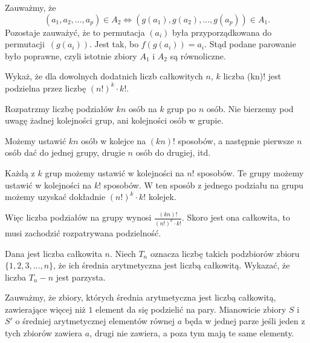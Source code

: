 Zauważmy, że
\[
	(a_1, a_2, ..., a_p) \in A_2 \iff (g(a_1), g(a_2), ..., g(a_p)) \in A_1.
\] 
Pozostaje zauważyć, że to permutacja $(a_i)$ była przyporządkowana do permutacji~$(g(a_i))$. Jest tak, bo $f(g(a_i)) = a_i$. Stąd podane parowanie było poprawne, czyli istotnie zbiory $A_1$ i $A_2$ są równoliczne.


\vspace{5px}

\begin{problem}{5}
	Wykaż, że dla dowolnych dodatnich liczb całkowitych $n$, $k$ liczba	(kn)!
	jest podzielna przez liczbę $(n!)^k \cdot k!$.
\end{problem}

\vspace{5px}

\noindent
Rozpatrzmy liczbę podziałów $kn$ osób na $k$ grup po $n$ osób. Nie bierzemy pod uwagę żadnej kolejności grup, ani kolejności osób w grupie. 

Możemy ustawić $kn$ osób w kolejce na $(kn)!$ sposobów, a następnie pierwsze $n$ osób dać do jednej grupy, drugie $n$ osób do drugiej, itd. 

Każdą z $k$ grup możemy ustawić w kolejności na $n!$ sposobów. Te grupy możemy ustawić w kolejności na $k!$ sposobów. W ten sposób z jednego podziału na grupu możemy uzyskać dokładnie $(n!)^k \cdot k!$ kolejek. 

Więc liczba podziałów na grupy wynosi $\frac{(kn)!}{(n!)^k \cdot k!}$. Skoro jest ona całkowita, to musi zachodzić rozpatrywana podzielność.

\vspace{5px}



\begin{problem}{6}
	Dana jest liczba całkowita $n$. Niech $T_n$ oznacza liczbę takich podzbiorów zbioru $\{1, 2, 3, ..., n\}$, że ich średnia arytmetyczna jest liczbą całkowitą. Wykazać, że liczba $T_n - n$ jest parzysta.
\end{problem}

\vspace{5px}


\noindent
Zauważmy, że zbiory, których średnia arytmetyczna jest liczbą całkowitą, zawierające więcej niż $1$ element da się podzielić na pary. Mianowicie zbiory $S$ i $S'$ o średniej arytmetycznej elementów równej $a$ będa w jednej parze jeśli jeden z tych zbiorów zawiera $a$, drugi nie zawiera, a poza tym mają te same elementy.


